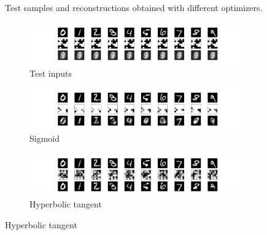 \begin{figure}[htbp]
  \caption{\label{Fig.optimizers}Test samples and reconstructions obtained with different optimizers.}
\end{figure}

\begin{figure}[htbp]
  \centering
  \begin{subfigure}{0.48\figwidth}
    \includegraphics[width=\textwidth,trim={14em 15em 12em 2em},clip]{basic-36-tanh-sgd-xent.pdf}
    \caption{\label{Fig.act.orig}Test inputs}
  \end{subfigure}

  \vspace{1em}
  
  \begin{subfigure}{0.48\figwidth}
    \includegraphics[width=\textwidth,trim={14em 2em 12em 16em},clip]{basic-36-sigmoid-rmsprop-xent.pdf}
    \caption{\label{Fig.act.sigm}Sigmoid}
  \end{subfigure}
  \begin{subfigure}{0.48\figwidth}
    \includegraphics[width=\textwidth,trim={14em 2em 12em 16em},clip]{basic-36-tanh-rmsprop-xent.pdf}
    \caption{\label{Fig.act.tanh}Hyperbolic tangent}
  \end{subfigure}

  \vspace{1em}
  

\end{figure}
